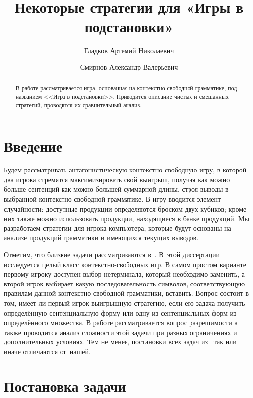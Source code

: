\documentclass{csmathnotes}
\title{Некоторые стратегии для «Игры в подстановки»}
\author{Гладков Артемий Николаевич}
\affiliation{Ярославский государственный университет им. П.Г. Демидова}
\author{Смирнов Александр Валерьевич}
\affiliation{Ярославский государственный университет им. П.Г. Демидова}
\begin{document}
\maketitle

\begin{abstract}
В работе рассматривается игра, основанная на контекстно-свободной грамматике, под названием <<Игра в подстановки>>. Приводится описание чистых и смешанных стратегий, проводится их сравнительный анализ. 

\end{abstract}

\section*{Введение}

Будем рассматривать антагонистическую контекстно-свободную игру, в которой два игрока стремятся максимизировать свой выигрыш, получая как можно больше сентенций как можно большей суммарной длины, строя выводы в выбранной контекстно-свободной грамматике. В игру вводится элемент случайности: доступные продукции определяются броском двух кубиков; кроме них также можно использовать продукции, находящиеся в банке продукций. Мы разработаем стратегии для игрока-компьютера, которые будут основаны на анализе продукций грамматики и имеющихся текущих выводов.

Отметим, что близкие задачи рассматриваются в~\cite{Schuster:2017}. В~этой диссертации исследуется целый класс контекстно-свободных игр. В самом простом варианте первому игроку доступен выбор нетерминала, который необходимо заменить, а второй игрок выбирает какую последовательность символов, соответствующую правилам данной контекстно-свободной грамматики, вставить. Вопрос состоит в том, имеет ли первый игрок выигрышную стратегию, если его задача получить определённую сентенциальную форму или одну из сентенциальных форм из определённого множества. В работе рассматривается вопрос разрешимости а также проводится анализ сложности этой задачи при разных ограничениях и дополнительных условиях. Тем не менее, постановки всех задач из~\cite{Schuster:2017} так или иначе отличаются от~нашей.

\section*{Постановка задачи}
\end{document}
